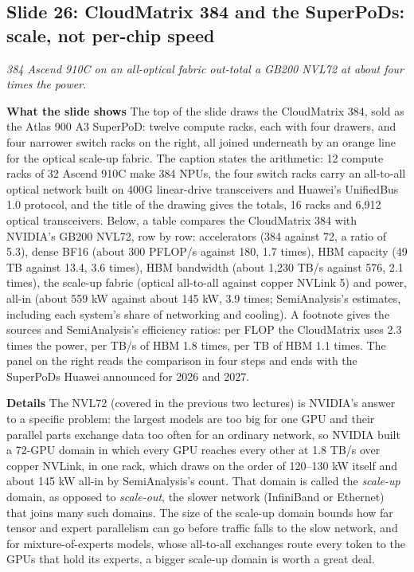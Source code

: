 \documentclass[11pt,letterpaper]{article}
\newcommand{\slide}[3]{%
  \subsection[Slide #1: #2]{Slide #1: #2}%
  {\color{muted}\itshape #3\par}\medskip}
\newcommand{\para}[1]{\medskip\noindent\textbf{#1}\quad}
\begin{document}
\slide{26}{CloudMatrix 384 and the SuperPoDs: scale, not per-chip speed}{384 Ascend 910C on an all-optical fabric out-total a GB200 NVL72 at about four times the power.}

\para{What the slide shows} The top of the slide draws the CloudMatrix 384, sold as the Atlas 900 A3 SuperPoD: twelve compute racks, each with four drawers, and four narrower switch racks on the right, all joined underneath by an orange line for the optical scale-up fabric. The caption states the arithmetic: 12 compute racks of 32 Ascend 910C make 384 NPUs, the four switch racks carry an all-to-all optical network built on 400G linear-drive transceivers and Huawei's UnifiedBus 1.0 protocol, and the title of the drawing gives the totals, 16 racks and 6{,}912 optical transceivers. Below, a table compares the CloudMatrix 384 with NVIDIA's GB200 NVL72, row by row: accelerators (384 against 72, a ratio of 5.3), dense BF16 (about 300 PFLOP/s against 180, 1.7 times), HBM capacity (49 TB against 13.4, 3.6 times), HBM bandwidth (about 1{,}230 TB/s against 576, 2.1 times), the scale-up fabric (optical all-to-all against copper NVLink 5) and power, all-in (about 559 kW against about 145 kW, 3.9 times; SemiAnalysis's estimates, including each system's share of networking and cooling). A footnote gives the sources and SemiAnalysis's efficiency ratios: per FLOP the CloudMatrix uses 2.3 times the power, per TB/s of HBM 1.8 times, per TB of HBM 1.1 times. The panel on the right reads the comparison in four steps and ends with the SuperPoDs Huawei announced for 2026 and 2027.

\para{Details} The NVL72 (covered in the previous two lectures) is NVIDIA's answer to a specific problem: the largest models are too big for one GPU and their parallel parts exchange data too often for an ordinary network, so NVIDIA built a 72-GPU domain in which every GPU reaches every other at 1.8 TB/s over copper NVLink, in one rack, which draws on the order of 120--130 kW itself and about 145 kW all-in by SemiAnalysis's count. That domain is called the \emph{scale-up} domain, as opposed to \emph{scale-out}, the slower network (InfiniBand or Ethernet) that joins many such domains. The size of the scale-up domain bounds how far tensor and expert parallelism can go before traffic falls to the slow network, and for mixture-of-experts models, whose all-to-all exchanges route every token to the GPUs that hold its experts, a bigger scale-up domain is worth a great deal.
\end{document}
